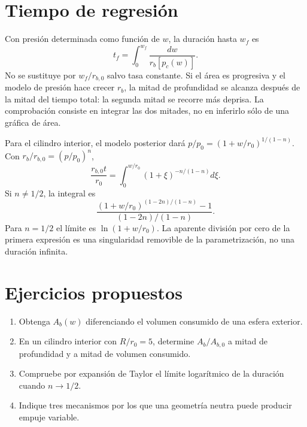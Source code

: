 \section{Tiempo de regresión}
Con presión determinada como función de $w$, la duración hasta $w_f$ es
\begin{equation}\label{eq:burntime}
 t_f=\int_0^{w_f}\frac{dw}{r_b[p_c(w)]}.
\end{equation}
No se sustituye por $w_f/r_{b,0}$ salvo tasa constante. Si el área es progresiva y el modelo de presión hace crecer $r_b$, la mitad de profundidad se alcanza después de la mitad del tiempo total: la segunda mitad se recorre más deprisa. La comprobación consiste en integrar las dos mitades, no en inferirlo sólo de una gráfica de área.

Para el cilindro interior, el modelo posterior dará $p/p_0=(1+w/r_0)^{1/(1-n)}$. Con $r_b/r_{b,0}=(p/p_0)^n$,
\[
 \frac{r_{b,0}t}{r_0}=\int_0^{w/r_0}(1+\xi)^{-n/(1-n)}d\xi.
\]
Si $n\ne1/2$, la integral es
\[
 \frac{(1+w/r_0)^{(1-2n)/(1-n)}-1}{(1-2n)/(1-n)}.
\]
Para $n=1/2$ el límite es $\ln(1+w/r_0)$. La aparente división por cero de la primera expresión es una singularidad removible de la parametrización, no una duración infinita.
\section{Ejercicios propuestos}
\begin{enumerate}
\item Obtenga $A_b(w)$ diferenciando el volumen consumido de una esfera exterior.
\item En un cilindro interior con $R/r_0=5$, determine $A_b/A_{b,0}$ a mitad de profundidad y a mitad de volumen consumido.
\item Compruebe por expansión de Taylor el límite logarítmico de la duración cuando $n\to1/2$.
\item Indique tres mecanismos por los que una geometría neutra puede producir empuje variable.
\end{enumerate}
